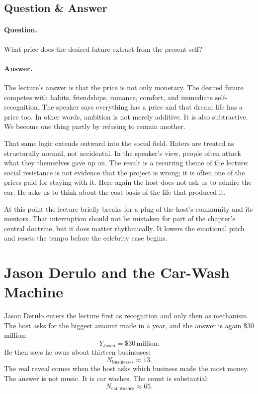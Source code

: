 \subsection{Question \& Answer}

\paragraph{Question.}
What price does the desired future extract from the present self?

\paragraph{Answer.}
The lecture's answer is that the price is not only monetary. The desired future competes with habits, friendships, romance, comfort, and immediate self-recognition. The speaker says everything has a price and that dream life has a price too. In other words, ambition is not merely additive. It is also subtractive. We become one thing partly by refusing to remain another.

That same logic extends outward into the social field. Haters are treated as structurally normal, not accidental. In the speaker's view, people often attack what they themselves gave up on. The result is a recurring theme of the lecture: social resistance is not evidence that the project is wrong; it is often one of the prices paid for staying with it. Here again the host does not ask us to admire the car. He asks us to think about the cost basis of the life that produced it.

At this point the lecture briefly breaks for a plug of the host's community and its mentors. That interruption should not be mistaken for part of the chapter's central doctrine, but it does matter rhythmically. It lowers the emotional pitch and resets the tempo before the celebrity case begins.

\section{Jason Derulo and the Car-Wash Machine}

Jason Derulo enters the lecture first as recognition and only then as mechanism. The host asks for the biggest amount made in a year, and the answer is again \(\$30\) million:
\begin{equation}
Y_{\text{Jason}}=\$30\,\text{million}.
\end{equation}
He then says he owns about thirteen businesses:
\begin{equation}
N_{\text{businesses}}\approx 13.
\end{equation}
The real reveal comes when the host asks which business made the most money. The answer is not music. It is car washes. The count is substantial:
\begin{equation}
N_{\text{car washes}}\approx 65.
\end{equation}


